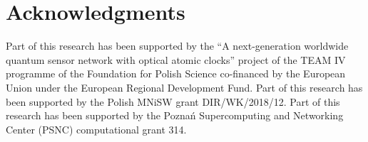 \section*{Acknowledgments}
{\footnotesize Part of this research has been supported by
  the ``A next-generation worldwide quantum sensor network with optical atomic clocks'' project of the TEAM IV programme of the Foundation for Polish Science co-financed by the European Union under the European Regional Development Fund.
  Part of this research has been supported by
  the Polish MNiSW grant DIR/WK/2018/12.
  Part of this research has been supported by
  the Pozna\'n Supercomputing and Networking Center (PSNC) computational grant 314.}
